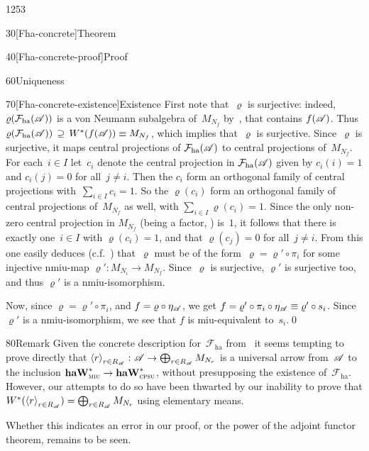 \begin{parsec}{1253}
\begin{point}{30}[Fha-concrete]{Theorem}
\begin{point}{40}[Fha-concrete-proof]{Proof}
\begin{point}{60}{Uniqueness}
\begin{point}{70}[Fha-concrete-existence]{Existence}
First note that~$\varrho$ is surjective:
indeed, $\varrho(\mathcal{F}_\mathrm{ha}(\mathscr{A}))$
is a von Neumann subalgebra of~$M_{N_f}$ by~,
that contains $f(\mathscr{A})$.
Thus $\varrho(\mathcal{F}_\mathrm{ha}(\mathscr{A}))
    \,\supseteq\, W^*(f(\mathscr{A}))\equiv M_{N_f}$,
which implies that~$\varrho$ is surjective.
Since~$\varrho$ is surjective, it maps central projections
    of $\mathcal{F}_\mathrm{ha}(\mathscr{A})$
    to central projections
    of~$M_{N_f}$.
    For each~$i\in I$ let~$c_i$
    denote the central projection in $\mathcal{F}_\mathrm{ha}(\mathscr{A})$
    given by $c_i(i)=1$ and $c_i(j)=0$ for all~$j\neq i$.
    Then the $c_i$ form an orthogonal family
    of  central projections with~$\sum_{i\in I}c_i =1$.
    So the $\varrho(c_i)$
    form an orthogonal family
    of central projections of~$M_{N_f}$ as well, 
    with $\sum_{i\in I} \varrho(c_i)=1$.
Since the only non-zero central projection in 
    $M_{N_f}$ (being a factor, ) is~$1$,
    it follows that there is exactly one~$i\in I$
    with $\varrho(c_i)=1$,
    and that $\varrho(c_j)=0$ for all~$j\neq i$.
    From this one easily deduces (c.f.~) 
    that~$\varrho$ must be of the form~$\varrho = \varrho'\circ \pi_i$
    for some injective nmiu-map $\varrho'\colon M_{N_i}\to M_{N_f}$.
    Since~$\varrho$ is surjective, $\varrho'$ is surjective too,
    and thus $\varrho'$ is a nmiu-isomorphism.

Now, since $\varrho = \varrho' \circ \pi_i $,
and $f=\varrho\circ \eta_{\mathscr{A}}$,
we get $f = \varrho' \circ \pi_i \circ \eta_{\mathscr{A}}\equiv
\varrho' \circ s_i$.
Since~$\varrho'$ is a nmiu-isomorphism,
we see that $f$ is miu-equivalent to~$s_i$.\qed
\end{point}
\end{point}
\end{point}
\end{point}
\begin{point}{80}{Remark}%
Given the concrete description for~$\mathcal{F}_\mathrm{ha}$
from~
it seems tempting to prove directly
that $\left<r\right>_{r\in R_{\mathscr{A}}}
\colon \mathscr{A}\to\bigoplus_{r\in R_{\mathscr{A}}}M_{N_r}$
is a universal arrow from~$\mathscr{A}$ to the inclusion
$\mathbf{haW}^*_{\text{\textsc{miu}}}\to\mathbf{haW}^*_{\text{\textsc{cpsu}}}$,
without presupposing the existence of~$\mathcal{F}_\mathrm{ha}$.
However, our attempts to do so have been thwarted
by our inability to prove  that
$W^*(\left<r\right>_{r\in R_{\mathscr{A}}})
= \bigoplus_{r\in R_{\mathscr{A}}} M_{N_r}$
using elementary means.

Whether this indicates an error in our proof,
or the power of the adjoint functor theorem,
remains to be seen.
\end{point}
\end{parsec}%

